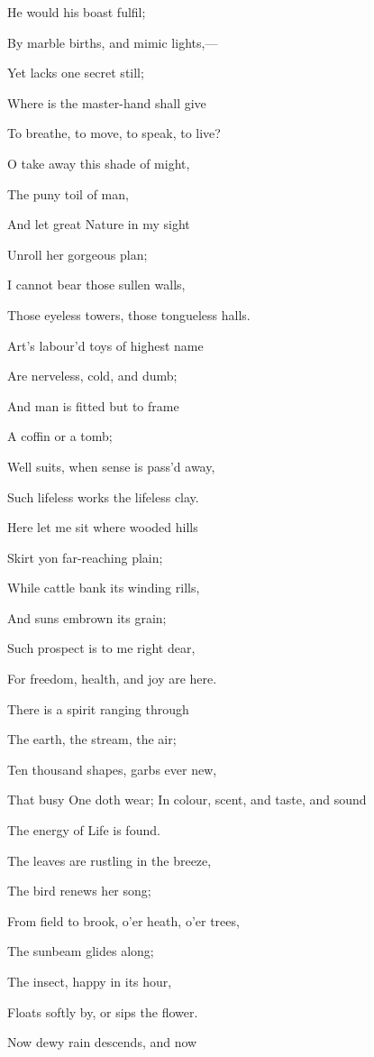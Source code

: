 He would his boast fulfil;

By marble births, and mimic lights,—

Yet lacks one secret still;

Where is the master-hand shall give

To breathe, to move, to speak, to live?

O take away this shade of might,

The puny toil of man,

And let great Nature in my sight

Unroll her gorgeous plan;

I cannot bear those sullen walls,

Those eyeless towers, those tongueless halls.

Art's labour'd toys of highest name

Are nerveless, cold, and dumb;

And man is fitted but to frame

A coffin or a tomb;

Well suits, when sense is pass'd away,

Such lifeless works the lifeless clay.

Here let me sit where wooded hills

Skirt yon far-reaching plain;

While cattle bank its winding rills,

And suns embrown its grain;

Such prospect is to me right dear,

For freedom, health, and joy are here.

There is a spirit ranging through

The earth, the stream, the air;

Ten thousand shapes, garbs ever new,

That busy One doth wear; In colour, scent, and taste, and sound

The energy of Life is found.

The leaves are rustling in the breeze,

The bird renews her song;

From field to brook, o'er heath, o'er trees,

The sunbeam glides along;

The insect, happy in its hour,

Floats softly by, or sips the flower.

Now dewy rain descends, and now

